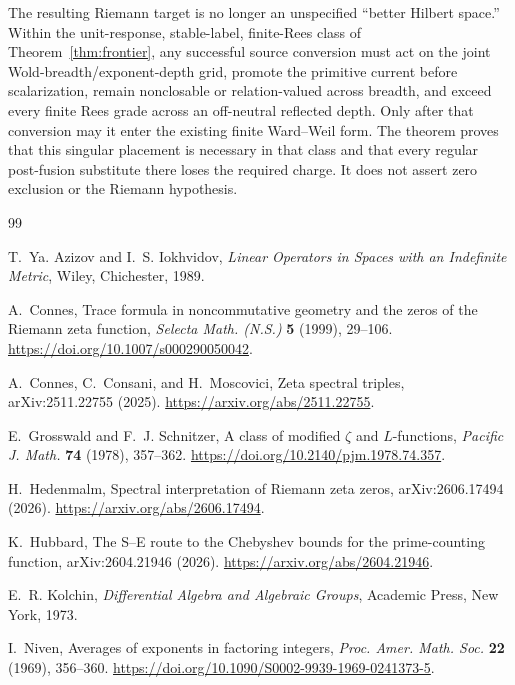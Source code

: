 \documentclass[11pt]{article}
\theoremstyle{definition}
\theoremstyle{remark}
\begin{document}
The resulting Riemann target is no longer an unspecified ``better Hilbert space.''  Within the
unit-response, stable-label, finite-Rees class of Theorem~\ref{thm:frontier}, any successful source
conversion must act on the joint Wold-breadth/exponent-depth grid, promote the primitive current
before scalarization, remain nonclosable or relation-valued across breadth, and exceed every finite
Rees grade across an off-neutral reflected depth.  Only after that conversion may it enter the
existing finite Ward--Weil form.  The theorem proves that this singular placement is necessary in
that class and that every regular post-fusion substitute there loses the required charge.  It does
not assert zero exclusion or the Riemann hypothesis.

\begin{thebibliography}{99}

T.~Ya. Azizov and I.~S. Iokhvidov,
\newblock \emph{Linear Operators in Spaces with an Indefinite Metric},
\newblock Wiley, Chichester, 1989.

A.~Connes,
\newblock Trace formula in noncommutative geometry and the zeros of the Riemann zeta function,
\newblock \emph{Selecta Math. (N.S.)} \textbf{5} (1999), 29--106.
\newblock \url{https://doi.org/10.1007/s000290050042}.

A.~Connes, C.~Consani, and H.~Moscovici,
\newblock Zeta spectral triples,
\newblock arXiv:2511.22755 (2025).
\newblock \url{https://arxiv.org/abs/2511.22755}.

E.~Grosswald and F.~J. Schnitzer,
\newblock A class of modified $\zeta$ and $L$-functions,
\newblock \emph{Pacific J. Math.} \textbf{74} (1978), 357--362.
\newblock \url{https://doi.org/10.2140/pjm.1978.74.357}.

H.~Hedenmalm,
\newblock Spectral interpretation of Riemann zeta zeros,
\newblock arXiv:2606.17494 (2026).
\newblock \url{https://arxiv.org/abs/2606.17494}.

K.~Hubbard,
\newblock The S--E route to the Chebyshev bounds for the prime-counting function,
\newblock arXiv:2604.21946 (2026).
\newblock \url{https://arxiv.org/abs/2604.21946}.

E.~R. Kolchin,
\newblock \emph{Differential Algebra and Algebraic Groups},
\newblock Academic Press, New York, 1973.

I.~Niven,
\newblock Averages of exponents in factoring integers,
\newblock \emph{Proc. Amer. Math. Soc.} \textbf{22} (1969), 356--360.
\newblock \url{https://doi.org/10.1090/S0002-9939-1969-0241373-5}.


\end{thebibliography}
\end{document}
